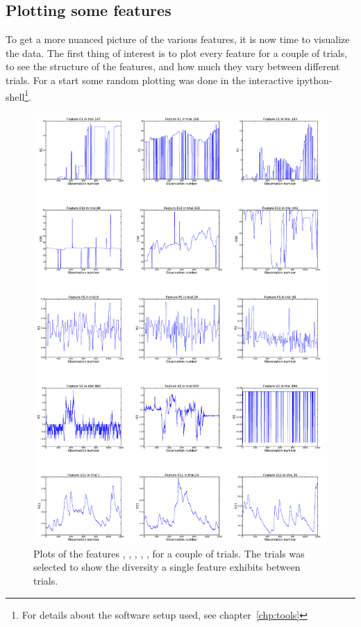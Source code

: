 \subsection{Plotting some features}
To get a more nuanced picture of the various features, it is now time to visualize the data. The first thing of interest is to plot every feature for a couple of trials, to see the structure of the features, and how much they vary between different trials. For a start some random plotting was done in the interactive ipython-shell\footnote{For details about the software setup used, see chapter~\ref{chp:tools}}. \par
\begin{figure}[!hbtp]
    \centering
        \includegraphics[width=\textwidth]{media/feature-plots-sheet.pdf}
    \caption{Plots of the features , , , , , for a couple of trials. The trials was selected to show the diversity a single feature exhibits between trials.}
    \label{fig:exploratory-feature-plots}
\end{figure}
